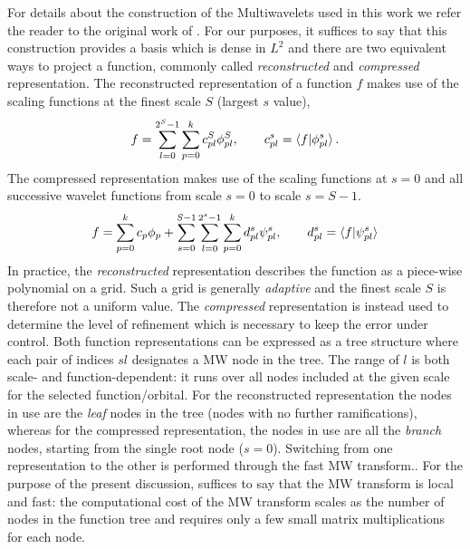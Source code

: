 \documentclass[journal=jctcce, manuscript=suppinfo]{achemso}
\begin{document}
For details about the construction of the Multiwavelets used in this work we refer the reader to the original work of \citeauthor{Alpert.10.1137/0524016}. \cite{Alpert.10.1137/0524016}
For our purposes, it suffices to say that this construction provides a basis which is dense in $L^2$ and there are two equivalent ways to project a function, commonly called \emph{reconstructed} and \emph{compressed} representation. The reconstructed representation of a function $f$ makes use of the scaling functions at the finest scale $S$ (largest $s$ value), 
\begin{equation}\label{eq:reconstructed_func}
  f = \sum_{l=0}^{2^S-1}\sum_{p=0}^k c^S_{pl} \phi^S_{pl}, \qquad c^s_{pl} = \braket{f | \phi^s_{pl}}. 
\end{equation}
The compressed representation makes use of the scaling functions at $s=0$ and all successive wavelet functions from scale $s=0$ to scale $s=S-1$.
\begin{equation}\label{eq:compressed_func}
  f = \sum_{p=0}^k c_{p} \phi_p + \sum_{s=0}^{S-1} \sum_{l=0}^{2^s-1} \sum_{p=0}^k d^s_{pl} \psi^s_{pl}, \qquad d^s_{pl} = \braket{f | \psi^s_{pl}}
\end{equation}
In practice, the \emph{reconstructed} representation describes the function as a piece-wise polynomial on a grid. Such a grid is generally \emph{adaptive} and the finest scale $S$ is therefore not a uniform value. The \emph{compressed} representation is instead used to determine the level of refinement which is necessary to keep the error under control.  Both function representations can be expressed as a tree structure where each pair of indices $sl$ designates a \ac{MW} node in the tree. The range of $l$ is both scale- and function-dependent: it runs over all nodes included at the given scale for the selected function/orbital. For the reconstructed representation the nodes in use are the \emph{leaf} nodes in the tree (nodes with no further ramifications), whereas for the compressed representation, the nodes in use are all the \emph{branch} nodes, starting from the single root node ($s=0$).
Switching from one representation to the other is performed through the fast \ac{MW} transform.\cite{Beylkin.10.1002/cpa.3160440202,Frediani.10.1080/00268976.2013.810793}. For the purpose of the present discussion, suffices to say that the \ac{MW} transform is local and fast: the computational cost of the \ac{MW} transform scales as the number of nodes in the function tree and requires only a few small matrix multiplications for each node.
\end{document}
